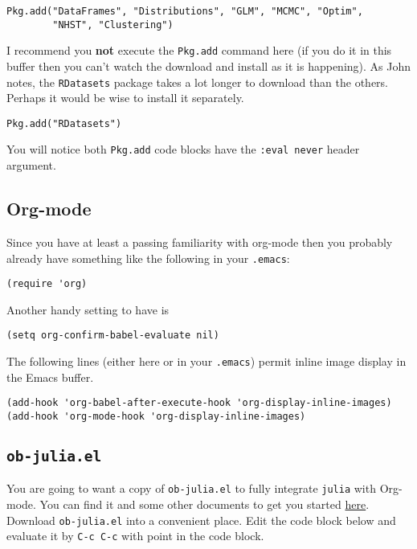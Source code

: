 \documentclass[11pt]{article}
\begin{document}
\begin{verbatim}
Pkg.add("DataFrames", "Distributions", "GLM", "MCMC", "Optim", 
        "NHST", "Clustering")
\end{verbatim}

I recommend you \textbf{not} execute the \texttt{Pkg.add} command here (if you do it
in this buffer then you can't watch the download and install as it is
happening).  As John notes, the \texttt{RDatasets} package takes a lot longer
to download than the others.  Perhaps it would be wise to install it
separately.

\begin{verbatim}
Pkg.add("RDatasets")
\end{verbatim}

You will notice both \texttt{Pkg.add} code blocks have the \texttt{:eval never}
header argument.
\subsection[Org-mode]{Org-mode}
\label{sec-1-4}

Since you have at least a passing familiarity with org-mode then you
probably already have something like the following in your \texttt{.emacs}:

\begin{verbatim}
(require 'org)
\end{verbatim}

Another handy setting to have is

\begin{verbatim}
(setq org-confirm-babel-evaluate nil)
\end{verbatim}

The following lines (either here or in your \texttt{.emacs}) permit inline
image display in the Emacs buffer.

\begin{verbatim}
(add-hook 'org-babel-after-execute-hook 'org-display-inline-images)   
(add-hook 'org-mode-hook 'org-display-inline-images)
\end{verbatim}
\subsection[\texttt{ob-julia.el}]{\texttt{ob-julia.el}}
\label{sec-1-5}

You are going to want a copy of \texttt{ob-julia.el} to fully integrate
\texttt{julia} with Org-mode.  You can find it and some other documents to
get you started \href{https://github.com/gjkerns/ob-julia}{here}.  Download \texttt{ob-julia.el} into a convenient place.
Edit the code block below and evaluate it by \texttt{C-c C-c} with point in
the code block.
\end{document}
